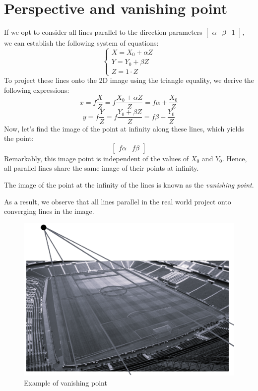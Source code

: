 \section{Perspective and vanishing point}

If we opt to consider all lines parallel to the direction parameters $\begin{bmatrix} \alpha & \beta & 1 \end{bmatrix}$, we can establish the following system of equations:
\[
    \begin{cases}
        X = X_0 + \alpha Z  \\
        Y = Y_0 + \beta Z   \\
        Z = 1 \cdot Z
    \end{cases}
\]
To project these lines onto the 2D image using the triangle equality, we derive the following expressions:
\[x=f \dfrac{X}{Z} = f \dfrac{X_0 + \alpha Z}{Z} = f\alpha + \dfrac{X_0}{Z}\]
\[y=f \dfrac{Y}{Z} = f \dfrac{Y_0 + \beta Z}{Z}  = f\beta  + \dfrac{Y_0}{Z}\]
Now, let's find the image of the point at infinity along these lines, which yields the point:
\[\begin{bmatrix} f\alpha & f\beta \end{bmatrix}\]
Remarkably, this image point is independent of the values of $X_0$ and $Y_0$. 
Hence, all parallel lines share the same image of their points at infinity.
\newpage
\begin{definition}
    The image of the point at the infinity of the lines is known as the \emph{vanishing point}. 
\end{definition}
As a result, we observe that all lines parallel in the real world project onto converging lines in the image.
\begin{figure}[H]
    \centering
    \includegraphics[width=0.4\linewidth]{images/vanishingpoint.png}
    \caption{Example of vanishing point}
\end{figure}